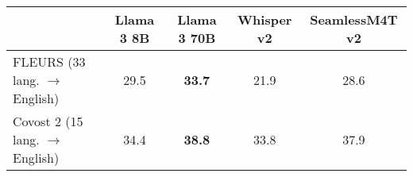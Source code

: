 \begin{NiceTabular}{lcccc}
	\CodeBefore
	\Body
	\toprule
	& \textbf{Llama 3 8B} & \textbf{Llama 3 70B} & \textbf{Whisper v2} & \textbf{SeamlessM4T v2}\\
	\midrule
	FLEURS \scriptsize{(33 lang. $\rightarrow$ English)} & 29.5 & \textbf{33.7}  & 21.9  & 28.6  \\
	Covost 2 \scriptsize{(15 lang. $\rightarrow$ English)} & 34.4 & \textbf{38.8} & 33.8  & 37.9 \\
	\bottomrule
\end{NiceTabular}

